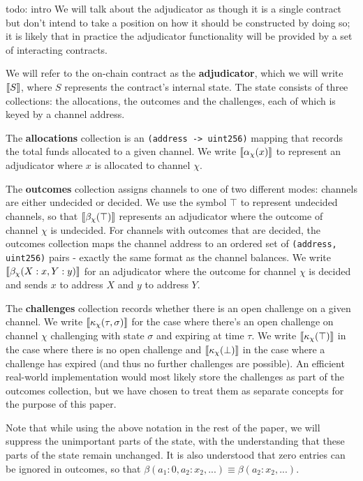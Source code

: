 todo: intro
We will talk about the adjudicator as though it is a single contract but don't intend to take a position on how it should be constructed by doing so; it is likely that in practice the adjudicator functionality will be provided by a set of interacting contracts.

We will refer to the on-chain contract as the \textbf{adjudicator}, which we will write $\llbracket S \rrbracket$, where $S$ represents the contract's internal state. The state consists of three collections: the allocations, the outcomes and the challenges, each of which is keyed by a channel address. 

The \textbf{allocations} collection is an \texttt{(address -> uint256)} mapping that records the total funds allocated to a given channel. We write $\llbracket \alpha_\chi(x) \rrbracket$ to represent an adjudicator where $x$ is allocated to channel $\chi$.

The \textbf{outcomes} collection assigns channels to one of two different modes: channels are either undecided or decided. We use the symbol $\top$ to represent undecided channels, so that $\llbracket \beta_\chi(\top) \rrbracket$ represents an adjudicator where the outcome of channel $\chi$ is undecided. For channels with outcomes that are decided, the outcomes collection maps the channel address to an ordered set of \texttt{(address, uint256)} pairs - exactly the same format as the channel balances. We write $\llbracket \beta_\chi(X: x, Y: y) \rrbracket$ for an adjudicator where the outcome for channel $\chi$ is decided and sends $x$ to address $X$ and $y$ to address $Y$.

The \textbf{challenges} collection records whether there is an open challenge on a given channel. We write $\llbracket \kappa_\chi(\tau, \sigma) \rrbracket$ for the case where there's an open challenge on channel $\chi$ challenging with state $\sigma$ and expiring at time $\tau$. We write $\llbracket \kappa_\chi(\top) \rrbracket$ in the case where there is no open challenge and $\llbracket \kappa_\chi(\bot) \rrbracket$ in the case where a challenge has expired (and thus no further challenges are possible). An efficient real-world implementation would most likely store the challenges as part of the outcomes collection, but we have chosen to treat them as separate concepts for the purpose of this paper.

Note that while using the above notation in the rest of the paper, we will suppress the unimportant parts of the state, with the understanding that these parts of the state remain unchanged. It is also understood that zero entries can be ignored in outcomes, so that $\beta(a_1: 0, a_2:x_2,...) \equiv \beta(a_2:x_2, ...)$.

